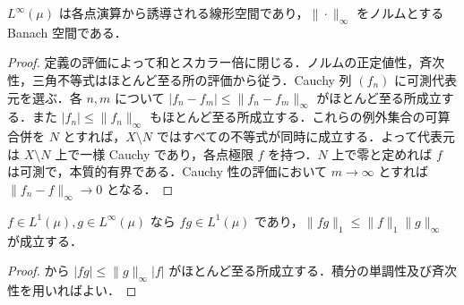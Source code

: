 \begin{prop}[L^∞ 空間のBanach性]
$L^\infty(\mu)$ は各点演算から誘導される線形空間であり，$\|\cdot\|_\infty$ をノルムとする Banach 空間である．
\end{prop}
\begin{proof}
定義の評価によって和とスカラー倍に閉じる．ノルムの正定値性，斉次性，三角不等式はほとんど至る所の評価から従う．Cauchy 列 $(f_n)$ に可測代表元を選ぶ．各 $n,m$ について $|f_n-f_m|\leq\|f_n-f_m\|_\infty$ がほとんど至る所成立する．また $|f_n|\leq\|f_n\|_\infty$ もほとんど至る所成立する．これらの例外集合の可算合併を $N$ とすれば，$X\setminus N$ ではすべての不等式が同時に成立する．よって代表元は $X\setminus N$ 上で一様 Cauchy であり，各点極限 $f$ を持つ．$N$ 上で零と定めれば $f$ は可測で，本質的有界である．Cauchy 性の評価において $m\to\infty$ とすれば $\|f_n-f\|_\infty\to0$ となる．
\end{proof}
\begin{prop}[Hölderの端点の場合]
$f\in L^1(\mu),g\in L^\infty(\mu)$ なら $fg\in L^1(\mu)$ であり，$\|fg\|_1\leq\|f\|_1\|g\|_\infty$ が成立する．
\end{prop}
\begin{proof}
 から $|fg|\leq\|g\|_\infty |f|$ がほとんど至る所成立する．積分の単調性及び斉次性を用いればよい．
\end{proof}
